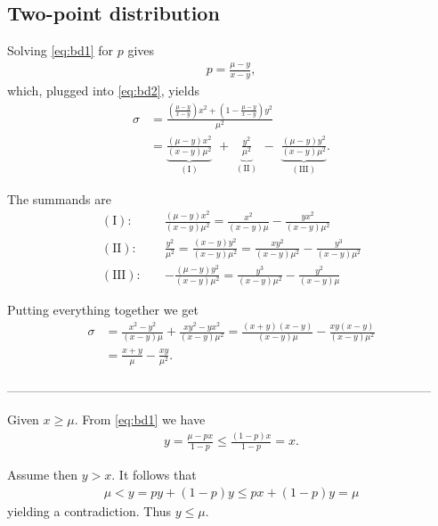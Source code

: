 \subsection{Two-point distribution}

Solving \eqref{eq:bd1} for $p$ gives
\begin{align}
  p = \frac{\mu-y}{x-y},
\end{align}
%
which, plugged into \eqref{eq:bd2}, yields
\begin{align}
  \sigma & = \frac{\left(\frac{\mu-y}{x-y}\right)x^2  + \left(1-\frac{\mu-y}{x-y}\right) y^2}{\mu^2} \\ & = \underbrace{\frac{(\mu - y)x^2}{(x-y)\mu^2}}_{\mathrm{(I)}}\,\, + \,\, \underbrace{\frac{y^2}{\mu^2}}_{\mathrm{(II)}}\,\, - \,\, \underbrace{\frac{(\mu - y)y^2}{(x-y) \mu^2}}_{\mathrm{(III)}}.
\end{align}

The summands are
\begin{align}
  \mathrm{(I):} \quad & \frac{(\mu - y)x^2}{(x-y)\mu^2} = \frac{x^2}{(x-y)\mu} - \frac{yx^2}{(x-y)\mu^2} \\
  \mathrm{(II):} \quad &  \frac{y^2}{\mu^2} = \frac{(x-y)y^2}{(x-y)\mu^2} = \frac{xy^2}{(x-y)\mu^2} - \frac{y^3}{(x-y)\mu^2} \\
  \mathrm{(III):} \quad & - \frac{(\mu - y)y^2}{(x-y) \mu^2} = \frac{y^3}{(x-y)\mu^2} - \frac{y^2}{(x-y)\mu}
\end{align}

Putting everything together we get
\begin{align}
  \sigma & =  \frac{x^2 - y^2}{(x-y)\mu} + \frac{xy^2 -yx^2}{(x-y)\mu^2}  = \frac{(x + y) (x-y)}{(x-y)\mu} - \frac{xy (x-y)}{(x-y)\mu^2} \\
  & = \frac{x+y}{\mu} - \frac{xy}{\mu^2}.
\end{align}

------------------------------------------------------------------------------------------------------

Given $x \geq \mu$. From \eqref{eq:bd1} we have
\begin{align}
  y = \frac{\mu - px}{1-p} \leq \frac{(1-p)x}{1-p} = x.
\end{align}

Assume then $y > x$. It follows that
\begin{align}
  \mu < y = py + (1-p)y \leq px + (1-p)y = \mu
\end{align}
yielding a contradiction. Thus $y \leq \mu$.


